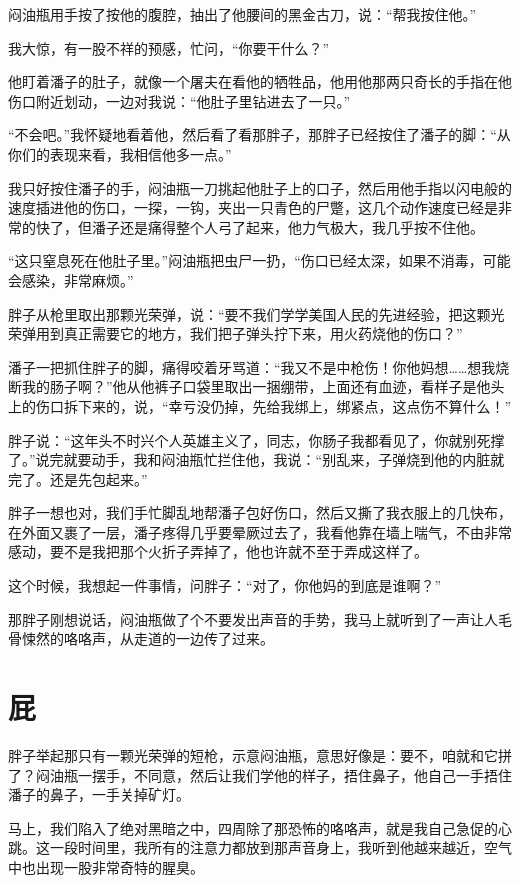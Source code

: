 闷油瓶用手按了按他的腹腔，抽出了他腰间的黑金古刀，说：“帮我按住他。”

我大惊，有一股不祥的预感，忙问，“你要干什么？”

他盯着潘子的肚子，就像一个屠夫在看他的牺牲品，他用他那两只奇长的手指在他伤口附近划动，一边对我说：“他肚子里钻进去了一只。”

“不会吧。”我怀疑地看着他，然后看了看那胖子，那胖子已经按住了潘子的脚：“从你们的表现来看，我相信他多一点。”

我只好按住潘子的手，闷油瓶一刀挑起他肚子上的口子，然后用他手指以闪电般的速度插进他的伤口，一探，一钩，夹出一只青色的尸蹩，这几个动作速度已经是非常的快了，但潘子还是痛得整个人弓了起来，他力气极大，我几乎按不住他。

“这只窒息死在他肚子里。”闷油瓶把虫尸一扔，“伤口已经太深，如果不消毒，可能会感染，非常麻烦。”

胖子从枪里取出那颗光荣弹，说：“要不我们学学美国人民的先进经验，把这颗光荣弹用到真正需要它的地方，我们把子弹头拧下来，用火药烧他的伤口？”

潘子一把抓住胖子的脚，痛得咬着牙骂道：“我又不是中枪伤！你他妈想……想我烧断我的肠子啊？”他从他裤子口袋里取出一捆绷带，上面还有血迹，看样子是他头上的伤口拆下来的，说，“幸亏没仍掉，先给我绑上，绑紧点，这点伤不算什么！”

胖子说：“这年头不时兴个人英雄主义了，同志，你肠子我都看见了，你就别死撑了。”说完就要动手，我和闷油瓶忙拦住他，我说：“别乱来，子弹烧到他的内脏就完了。还是先包起来。”

胖子一想也对，我们手忙脚乱地帮潘子包好伤口，然后又撕了我衣服上的几快布，在外面又裹了一层，潘子疼得几乎要晕厥过去了，我看他靠在墙上喘气，不由非常感动，要不是我把那个火折子弄掉了，他也许就不至于弄成这样了。

这个时候，我想起一件事情，问胖子：“对了，你他妈的到底是谁啊？”

那胖子刚想说话，闷油瓶做了个不要发出声音的手势，我马上就听到了一声让人毛骨悚然的咯咯声，从走道的一边传了过来。

\chapter{屁}

胖子举起那只有一颗光荣弹的短枪，示意闷油瓶，意思好像是：要不，咱就和它拼了？闷油瓶一摆手，不同意，然后让我们学他的样子，捂住鼻子，他自己一手捂住潘子的鼻子，一手关掉矿灯。

马上，我们陷入了绝对黑暗之中，四周除了那恐怖的咯咯声，就是我自己急促的心跳。这一段时间里，我所有的注意力都放到那声音身上，我听到他越来越近，空气中也出现一股非常奇特的腥臭。


